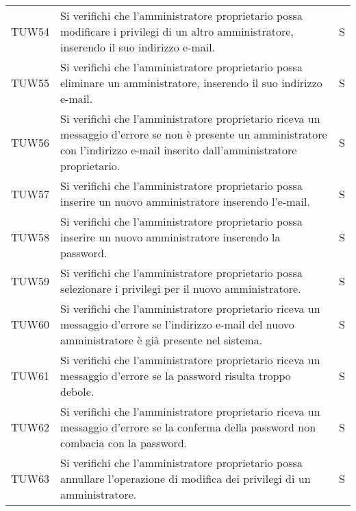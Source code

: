 {\begin{longtable}{ c C{13cm} C{1cm}}
TUW54 & Si verifichi che l’amministratore proprietario possa modificare i privilegi di un altro amministratore, inserendo il suo indirizzo e-mail. & S \\
TUW55 & Si verifichi che l’amministratore proprietario possa eliminare un amministratore, inserendo il suo indirizzo e-mail. & S \\
TUW56 & Si verifichi che l’amministratore proprietario riceva un messaggio d'errore se non è presente un amministratore con l'indirizzo e-mail inserito dall'amministratore proprietario. & S \\
TUW57 & Si verifichi che l’amministratore proprietario possa inserire un nuovo amministratore inserendo l’e-mail. & S \\
TUW58 & Si verifichi che l’amministratore proprietario possa inserire un nuovo amministratore inserendo la password. & S \\
TUW59 & Si verifichi che l’amministratore proprietario possa selezionare i privilegi per il nuovo amministratore. & S \\
TUW60 & Si verifichi che l’amministratore proprietario riceva un messaggio d'errore se l'indirizzo e-mail del nuovo amministratore è già presente nel sistema. & S \\
TUW61 & Si verifichi che l’amministratore proprietario riceva un messaggio d'errore se la password risulta troppo debole. & S \\
TUW62 & Si verifichi che l’amministratore proprietario riceva un messaggio d'errore se la conferma della password non combacia con la password. & S \\
TUW63 & Si verifichi che l’amministratore proprietario possa annullare l'operazione di modifica dei privilegi di un amministratore.  & S \\
\end{longtable}
}